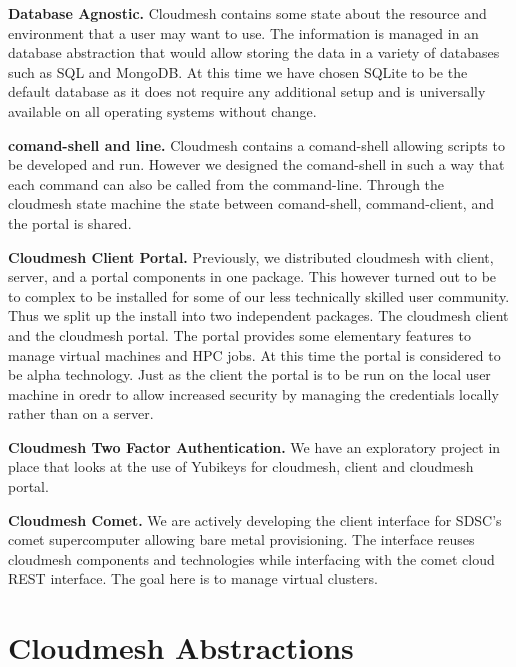 \begin{description}
\item{\bf Database Agnostic.} Cloudmesh contains some state about the
resource and environment that a user may want to use. The information
is managed in an database abstraction that would allow storing the
data in a variety of databases such as SQL and MongoDB. At this time
we have chosen SQLite to be the default database as it does not
require any additional setup and is universally available on all
operating systems without change.

\item{\bf comand-shell and line.} Cloudmesh contains a comand-shell
allowing scripts to be developed and run. However we designed the
comand-shell in such a way that each command can also be called from
the command-line. Through the cloudmesh state machine the state
between comand-shell, command-client, and the portal is shared.

\item{\bf Cloudmesh Client Portal.} Previously, we distributed
cloudmesh with client, server, and a portal components in one
package. This however turned out to be to complex to be installed for
some of our less technically skilled user community. Thus we split up
the install into two independent packages. The cloudmesh client and
the cloudmesh portal. The portal provides some elementary features to
manage virtual machines and HPC jobs. At this time the portal is
considered to be alpha technology. Just as the client the portal is to
be run on the local user machine in oredr to allow increased security
by managing the credentials locally rather than on a server.

\item{\bf Cloudmesh Two Factor Authentication.} We have an
exploratory project in place that looks at the use of Yubikeys for
cloudmesh, client and cloudmesh portal.

\item{\bf Cloudmesh Comet.} We are actively developing the client
interface for SDSC’s comet supercomputer allowing bare metal
provisioning. The interface reuses cloudmesh components and
technologies while interfacing with the comet cloud REST
interface. The goal here is to manage virtual clusters.

\end{description}




\section{Cloudmesh Abstractions}\label{S:abstraction}

